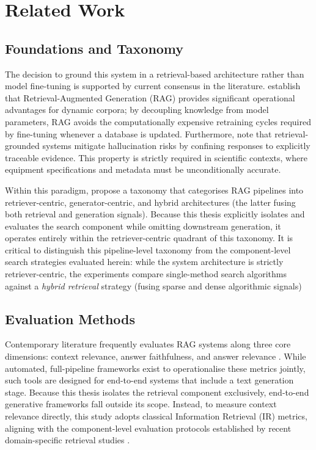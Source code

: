 \section{Related Work}\label{sec:papers}

\subsection{Foundations and Taxonomy}

The decision to ground this system in a retrieval-based architecture rather than model fine-tuning is supported by current consensus in the literature. \citet{gao2023retrieval} establish that Retrieval-Augmented Generation (RAG) provides significant operational advantages for dynamic corpora; by decoupling knowledge from model parameters, RAG avoids the computationally expensive retraining cycles required by fine-tuning whenever a database is updated. Furthermore, \citet{gao2023retrieval} note that retrieval-grounded systems mitigate hallucination risks by confining responses to explicitly traceable evidence. This property is strictly required in scientific contexts, where equipment specifications and metadata must be unconditionally accurate.

Within this paradigm, \citet{sharma2025retrieval} propose a taxonomy that categorises RAG pipelines into retriever-centric, generator-centric, and hybrid architectures (the latter fusing both retrieval and generation signals). Because this thesis explicitly isolates and evaluates the search component while omitting downstream generation, it operates entirely within the retriever-centric quadrant of this taxonomy. It is critical to distinguish this pipeline-level taxonomy from the component-level search strategies evaluated herein: while the system architecture is strictly retriever-centric, the experiments compare single-method search algorithms against a \textit{hybrid retrieval} strategy (fusing sparse and dense algorithmic signals)

\subsection{Evaluation Methods}

Contemporary literature frequently evaluates RAG systems along three core dimensions: context relevance, answer faithfulness, and answer relevance \citep{gao2023retrieval, sharma2025retrieval}. While automated, full-pipeline frameworks exist to operationalise these metrics jointly, such tools are designed for end-to-end systems that include a text generation stage. Because this thesis isolates the retrieval component exclusively, end-to-end generative frameworks fall outside its scope. Instead, to measure context relevance directly, this study adopts classical Information Retrieval (IR) metrics, aligning with the component-level evaluation protocols established by recent domain-specific retrieval studies \citep{pandey2026domain, xu2024retrieval}.

